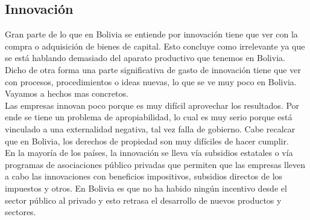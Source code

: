 \documentclass[10pt]{book}
\begin{document}
\begin{multicols}{2}
\subsection*{Innovación}
Gran parte de lo que en Bolivia se entiende por innovación tiene que ver con la compra o adquisición de bienes de capital. Esto concluye como irrelevante ya que se está hablando demasiado del aparato productivo que tenemos en Bolivia. Dicho de otra forma una parte significativa de gasto de innovación tiene que ver con procesos, procedimientos o ideas nuevas, lo que se ve muy poco en Bolivia. Vayamos a hechos mas concretos.\\
Las empresas innovan poco porque es muy difícil aprovechar los resultados. Por ende se tiene un problema de apropiabilidad, lo cual es muy serio porque está vinculado a una externalidad negativa, tal vez  falla de gobierno. Cabe recalcar que en Bolivia, los derechos de propiedad son muy difíciles de hacer cumplir.\\
En la mayoría de los países, la innovación se lleva vía subsidios estatales o vía programas de asociaciones público privadas que permiten que las empresas lleven a cabo las innovaciones con beneficios impositivos, subsidios directos de los impuestos y otros. En Bolivia es que no ha habido ningún incentivo desde el sector público al privado y esto retrasa el desarrollo de nuevos productos y sectores.\cite{tres}\\


\end{multicols}
\end{document}
